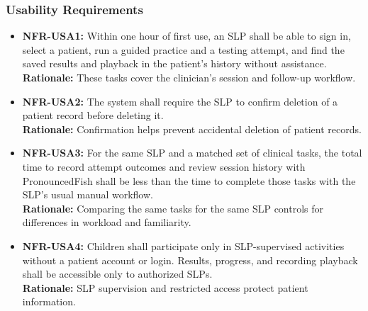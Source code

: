 \documentclass[12pt]{article}
\begin{document}
    \subsubsection{Usability Requirements}
    \begin{itemize}
        \item \textbf{NFR-USA1:} Within one hour of first use, an SLP shall be able to sign in, select a patient, run a guided practice and a testing attempt, and find the saved results and playback in the patient's history without assistance. \\
        \textbf{Rationale:} These tasks cover the clinician's session and follow-up workflow.
        \item \textbf{NFR-USA2:} The system shall require the SLP to confirm deletion of a patient record before deleting it.\\
        \textbf{Rationale:} Confirmation helps prevent accidental deletion of patient records.
        \item \textbf{NFR-USA3:} For the same SLP and a matched set of clinical tasks, the total time to record attempt outcomes and review session history with PronouncedFish shall be less than the time to complete those tasks with the SLP's usual manual workflow. \\
        \textbf{Rationale:} Comparing the same tasks for the same SLP controls for differences in workload and familiarity.
        \item \textbf{NFR-USA4:} Children shall participate only in SLP-supervised activities without a patient account or login. Results, progress, and recording playback shall be accessible only to authorized SLPs. \\
        \textbf{Rationale:} SLP supervision and restricted access protect patient information.
    \end{itemize}
\end{document}
